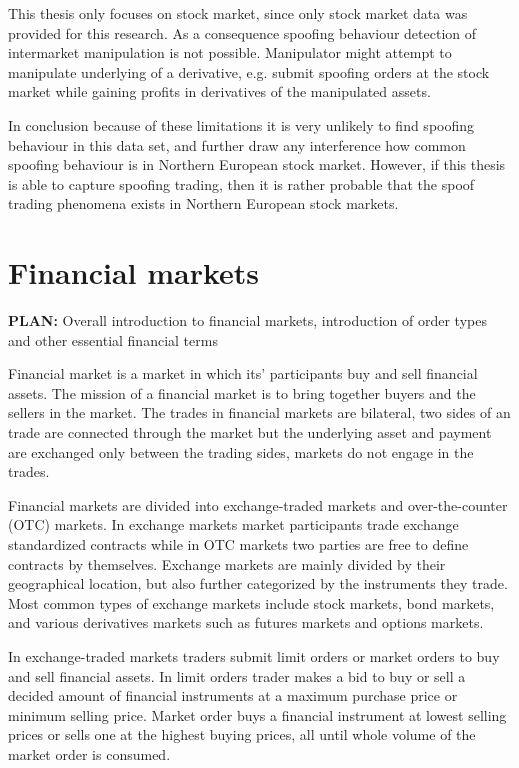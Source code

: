 \documentclass{tut-thesis}
\begin{document}
This thesis only focuses on stock market, since only stock market data was provided for this research. As a consequence spoofing behaviour detection of intermarket manipulation is not possible. Manipulator might attempt to manipulate underlying of a derivative, e.g. submit spoofing orders at the stock market while gaining profits in derivatives of the manipulated assets.

In conclusion because of these limitations it is very unlikely to find spoofing behaviour in this data set, and further draw any interference how common spoofing behaviour is in Northern European stock market. However, if this thesis is able to capture spoofing trading, then it is rather probable that the spoof trading phenomena exists in Northern European stock markets.

\chapter{Financial markets}
\textbf{PLAN:} Overall introduction to financial markets, introduction of order types and other essential financial terms

Financial market is a market in which its' participants buy and sell financial assets. The mission of a financial market is to bring together buyers and the sellers in the market. The trades in financial markets are bilateral, two sides of an trade are connected through the market but the underlying asset and payment are exchanged only between the trading sides, markets do not engage in the trades.

Financial markets are divided into exchange-traded markets and over-the-counter (OTC) markets. In exchange markets market participants trade exchange standardized contracts while in OTC markets two parties are free to define contracts by themselves. Exchange markets are mainly divided by their geographical location, but also further categorized by the instruments they trade. Most common types of exchange markets include stock markets, bond markets, and various derivatives markets such as futures markets and options markets. \autocite{Hull2017}

In exchange-traded markets traders submit limit orders or market orders to buy and sell financial assets. In limit orders trader makes a bid to buy or sell a decided amount of financial instruments at a maximum purchase price or minimum selling price. Market order buys a financial instrument at lowest selling prices or sells one at the highest buying prices, all until whole volume of the market order is consumed. 
\end{document}
